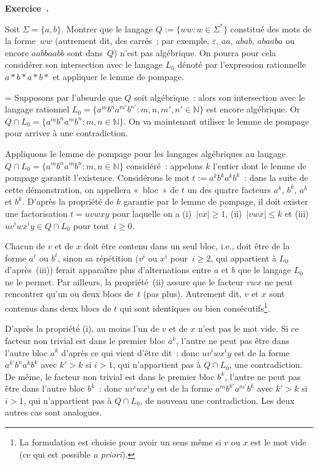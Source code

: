 \documentclass[12pt,a4paper]{article}
\theoremstyle{definition}
\newcommand\exercice{%
\refstepcounter{comcnt}\bigskip\noindent\textbf{Exercice~\thecomcnt.}}
\newif\ifcorrige
\newenvironment{corrige}%
{\ifcorrige\relax\else\setbox0=\vbox\bgroup\fi%
\smallbreak\footnotesize\noindent{\underbar{\textit{Corrigé.}}\quad}}
{{\hbox{}\nobreak\hfill\checkmark}%
\ifcorrige\relax\else\egroup\fi\par}
\begin{document}
%

\exercice\label{square-words-not-algebraic}

Soit $\Sigma = \{a,b\}$.  Montrer que le langage $Q := \{ww :
w\in\Sigma^*\}$ constitué des mots de la forme $ww$ (autrement dit,
des carrés ; par exemple, $\varepsilon$, $aa$, $abab$, $abaaba$ ou
encore $aabbaabb$ sont dans $Q$) n'est pas algébrique.  On pourra pour
cela considérer son intersection avec le langage $L_0$ dénoté par
l'expression rationnelle $a{*}b{*}a{*}b{*}$ et appliquer le lemme de
pompage.

\begin{corrige}
Supposons par l'absurde que $Q$ soit algébrique : alors son
intersection avec le langage rationnel $L_0 = \{a^m b^n a^{m'} b^{n'} :
m,n,m',n' \in \mathbb{N}\}$ est encore algébrique.  Or $Q \cap L_0 =
\{a^m b^n a^m b^n : m,n \in \mathbb{N}\}$.  On va maintenant utiliser
le lemme de pompage pour arriver à une contradiction.

Appliquons le lemme de pompage pour les langages algébriques au
langage $Q \cap L_0 = \{a^m b^n a^m b^n : m,n \in \mathbb{N}\}$
considéré : appelons $k$ l'entier dont le lemme de pompage garantit
l'existence.  Considérons le mot $t := a^k b^k a^k b^k$ : dans la
suite de cette démonstration, on appellera « bloc » de $t$ un des
quatre facteurs $a^k$, $b^k$, $a^k$ et $b^k$.  D'après la propriété de
$k$ garantie par le lemme de pompage, il doit exister une
factorisation $t = uvwxy$ pour laquelle on a (i) $|vx|\geq 1$,
(ii) $|vwx|\leq k$ et (iii) $uv^iwx^iy \in Q \cap L_0$ pour
tout $i\geq 0$.

Chacun de $v$ et de $x$ doit être contenu dans un seul bloc, i.e.,
doit être de la forme $a^\ell$ ou $b^\ell$, sinon sa répétition ($v^i$
ou $x^i$ pour $i\geq 2$, qui appartient à $L_0$ d'après (iii)) ferait
apparaître plus d'alternations entre $a$ et $b$ que le langage $L_0$
ne le permet.  Par ailleurs, la propriété (ii) assure que le facteur
$vwx$ ne peut rencontrer qu'un ou deux blocs de $t$ (pas plus).
Autrement dit, $v$ et $x$ sont contenus dans deux blocs de $t$ qui
sont identiques ou bien consécutifs\footnote{La formulation est
  choisie pour avoir un sens même si $v$ ou $x$ est le mot vide (ce
  qui est possible \textit{a priori}).}.

D'après la propriété (i), au moins l'un de $v$ et de $x$ n'est pas le
mot vide.  Si ce facteur non trivial est dans le premier bloc $a^k$,
l'autre ne peut pas être dans l'autre bloc $a^k$ d'après ce qui vient
d'être dit : donc $uv^iwx^iy$ est de la forme $a^{k'} b^n a^k b^k$
avec $k'>k$ si $i>1$, qui n'appartient pas à $Q\cap L_0$, une
contradiction.  De même, le facteur non trivial est dans le premier
bloc $b^k$, l'autre ne peut pas être dans l'autre bloc $b^k$ : donc
$uv^iwx^iy$ est de la forme $a^m b^{k'} a^{m'} b^k$ avec $k'>k$ si
$i>1$, qui n'appartient pas à $Q\cap L_0$, de nouveau une
contradiction.  Les deux autres cas sont analogues.
\end{corrige}
\end{document}

